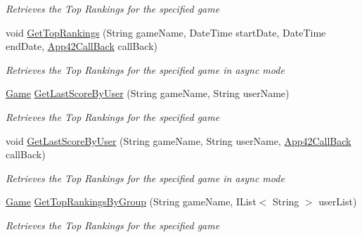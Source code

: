 \begin{DoxyCompactItemize}
\begin{DoxyCompactList}\small\item\em Retrieves the Top Rankings for the specified game \end{DoxyCompactList}\item 
void \hyperlink{classcom_1_1shephertz_1_1app42_1_1paas_1_1sdk_1_1csharp_1_1game_1_1_score_board_service_a87496aa14883485355bad8e55bc39f19}{Get\+Top\+Rankings} (String game\+Name, Date\+Time start\+Date, Date\+Time end\+Date, \hyperlink{interfacecom_1_1shephertz_1_1app42_1_1paas_1_1sdk_1_1csharp_1_1_app42_call_back}{App42\+Call\+Back} call\+Back)
\begin{DoxyCompactList}\small\item\em Retrieves the Top Rankings for the specified game in async mode \end{DoxyCompactList}\item 
\hyperlink{classcom_1_1shephertz_1_1app42_1_1paas_1_1sdk_1_1csharp_1_1game_1_1_game}{Game} \hyperlink{classcom_1_1shephertz_1_1app42_1_1paas_1_1sdk_1_1csharp_1_1game_1_1_score_board_service_a0f60dca6f912340097884444436ed71a}{Get\+Last\+Score\+By\+User} (String game\+Name, String user\+Name)
\begin{DoxyCompactList}\small\item\em Retrieves the Top Rankings for the specified game \end{DoxyCompactList}\item 
void \hyperlink{classcom_1_1shephertz_1_1app42_1_1paas_1_1sdk_1_1csharp_1_1game_1_1_score_board_service_a1a5f05f2dc4db6e98ca5c6da88d4dca5}{Get\+Last\+Score\+By\+User} (String game\+Name, String user\+Name, \hyperlink{interfacecom_1_1shephertz_1_1app42_1_1paas_1_1sdk_1_1csharp_1_1_app42_call_back}{App42\+Call\+Back} call\+Back)
\begin{DoxyCompactList}\small\item\em Retrieves the Top Rankings for the specified game in async mode \end{DoxyCompactList}\item 
\hyperlink{classcom_1_1shephertz_1_1app42_1_1paas_1_1sdk_1_1csharp_1_1game_1_1_game}{Game} \hyperlink{classcom_1_1shephertz_1_1app42_1_1paas_1_1sdk_1_1csharp_1_1game_1_1_score_board_service_a4a34b01eaa2114d82a3c7a87b3bc32bb}{Get\+Top\+Rankings\+By\+Group} (String game\+Name, I\+List$<$ String $>$ user\+List)
\begin{DoxyCompactList}\small\item\em Retrieves the Top Rankings for the specified game \end{DoxyCompactList}\item 

\end{DoxyCompactItemize}
